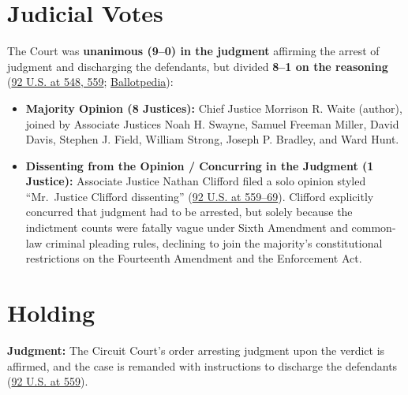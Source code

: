 \documentclass[12pt]{article}
\begin{document}
\section{Judicial Votes}

The Court was \textbf{unanimous (9--0) in the judgment} affirming the arrest of judgment and discharging the defendants, but divided \textbf{8--1 on the reasoning} (\href{https://supreme.justia.com/cases/federal/us/92/542/}{92 U.S. at 548, 559}; \href{https://ballotpedia.org/UNITED_STATES_v._CRUIKSHANK_et_al._(1876)}{Ballotpedia}):

\begin{itemize}
    \item \textbf{Majority Opinion (8 Justices):} Chief Justice Morrison R. Waite (author), joined by Associate Justices Noah H. Swayne, Samuel Freeman Miller, David Davis, Stephen J. Field, William Strong, Joseph P. Bradley, and Ward Hunt.
    \item \textbf{Dissenting from the Opinion / Concurring in the Judgment (1 Justice):} Associate Justice Nathan Clifford filed a solo opinion styled ``Mr.~Justice Clifford dissenting'' (\href{https://supreme.justia.com/cases/federal/us/92/542/}{92 U.S. at 559--69}). Clifford explicitly concurred that judgment had to be arrested, but solely because the indictment counts were fatally vague under Sixth Amendment and common-law criminal pleading rules, declining to join the majority's constitutional restrictions on the Fourteenth Amendment and the Enforcement Act.
\end{itemize}

\section{Holding}

\textbf{Judgment:} The Circuit Court's order arresting judgment upon the verdict is affirmed, and the case is remanded with instructions to discharge the defendants (\href{https://supreme.justia.com/cases/federal/us/92/542/}{92 U.S. at 559}).
\end{document}
